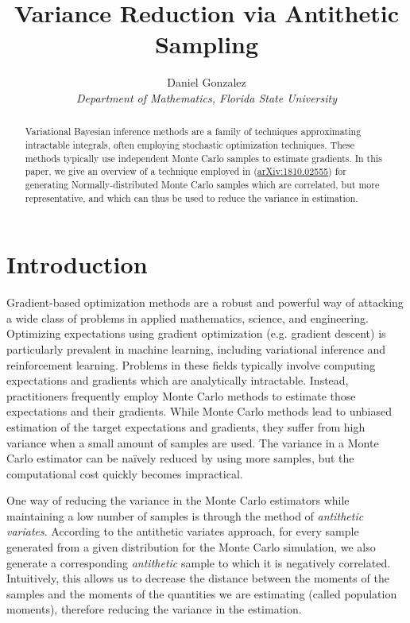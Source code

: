 \documentclass[12pt, a4paper]{article}
\begin{document}
\title{Variance Reduction via Antithetic Sampling}
\author{Daniel Gonzalez\\{\small \it Department of Mathematics, Florida State University}}

\maketitle

\begin{abstract}
    Variational Bayesian inference methods are a family of techniques approximating intractable integrals, often employing stochastic optimization techniques.
    These methods typically use independent Monte Carlo samples to estimate gradients.
    In this paper, we give an overview of a technique employed in (\href{https://arxiv.org/pdf/1810.02555.pdf}{arXiv:1810.02555})
    for generating Normally-distributed Monte Carlo samples which are correlated, but more representative, and which can thus be used to reduce the variance in estimation.
\end{abstract}

\section{Introduction} \label{sec:1}
Gradient-based optimization methods are a robust and powerful way of attacking a wide class of problems in applied mathematics, science, and engineering.
Optimizing expectations using gradient optimization (e.g. gradient descent) is particularly prevalent in machine learning,
including variational inference and reinforcement learning.
Problems in these fields typically involve computing expectations and gradients which are analytically intractable.
Instead, practitioners frequently employ Monte Carlo methods to estimate those expectations and their gradients.
While Monte Carlo methods lead to unbiased estimation of the target expectations and gradients, they suffer from high variance when a small amount of samples are used.
The variance in a Monte Carlo estimator can be na\"ively  reduced by using more samples, but the computational cost quickly becomes impractical. 

One way of reducing the variance in the Monte Carlo estimators while maintaining a low number of samples is through the method of {\it antithetic variates}.
According to the antithetic variates approach, for every sample generated from a given distribution for the Monte Carlo simulation,
we also generate a corresponding {\it antithetic} sample to which it is negatively correlated.
Intuitively, this allows us to decrease the distance between the moments of the samples and the moments of the quantities we are estimating (called population moments),
therefore reducing the variance in the estimation.
\end{document}
